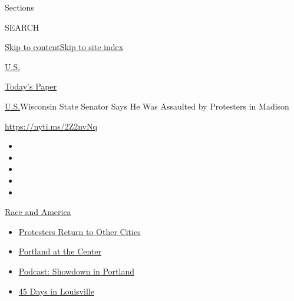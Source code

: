 Sections

SEARCH

\protect\hyperlink{site-content}{Skip to
content}\protect\hyperlink{site-index}{Skip to site index}

\href{https://www.nytimes3xbfgragh.onion/section/us}{U.S.}

\href{https://myaccount.nytimes3xbfgragh.onion/auth/login?response_type=cookie\&client_id=vi}{}

\href{https://www.nytimes3xbfgragh.onion/section/todayspaper}{Today's
Paper}

\href{/section/us}{U.S.}\textbar{}Wisconsin State Senator Says He Was
Assaulted by Protesters in Madison

\url{https://nyti.ms/2Z2nvNq}

\begin{itemize}
\item
\item
\item
\item
\item
\end{itemize}

\href{https://www.nytimes3xbfgragh.onion/news-event/george-floyd-protests-minneapolis-new-york-los-angeles?action=click\&pgtype=Article\&state=default\&region=TOP_BANNER\&context=storylines_menu}{Race
and America}

\begin{itemize}
\tightlist
\item
  \href{https://www.nytimes3xbfgragh.onion/2020/07/26/us/protests-portland-seattle-trump.html?action=click\&pgtype=Article\&state=default\&region=TOP_BANNER\&context=storylines_menu}{Protesters
  Return to Other Cities}
\item
  \href{https://www.nytimes3xbfgragh.onion/2020/07/24/us/portland-oregon-protests-white-race.html?action=click\&pgtype=Article\&state=default\&region=TOP_BANNER\&context=storylines_menu}{Portland
  at the Center}
\item
  \href{https://www.nytimes3xbfgragh.onion/2020/07/23/podcasts/the-daily/portland-protests.html?action=click\&pgtype=Article\&state=default\&region=TOP_BANNER\&context=storylines_menu}{Podcast:
  Showdown in Portland}
\item
  \href{https://www.nytimes3xbfgragh.onion/interactive/2020/07/16/us/black-lives-matter-protests-louisville-breonna-taylor.html?action=click\&pgtype=Article\&state=default\&region=TOP_BANNER\&context=storylines_menu}{45
  Days in Louisville}
\end{itemize}

